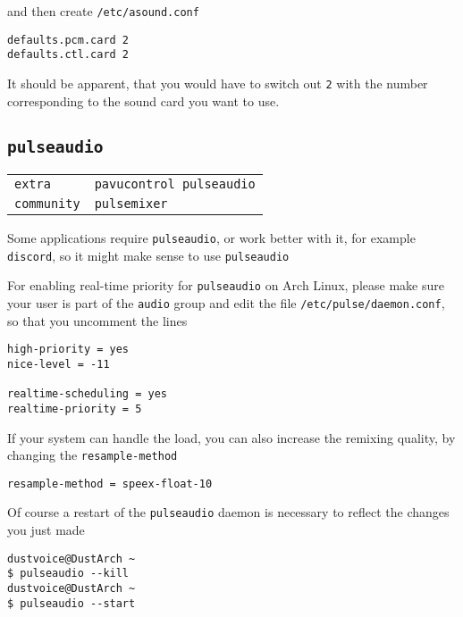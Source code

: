 \documentclass[9pt]{report}
\newenvironment{NOTE}
{\begin{tcolorbox}[colback=admonitionBG,coltitle=draculaFG,colframe=draculaBlue,colbacktitle=draculaBlue,title=NOTE]}
{\end{tcolorbox}}
\newenvironment{packagetable}
{\begin{longtabu}to \textwidth [b]{X[1,r]|X[1,l]}}
{\end{longtabu}}
\begin{document}
and then create \texttt{/etc/asound.conf}


\begin{verbatim}
defaults.pcm.card 2
defaults.ctl.card 2
\end{verbatim}

\begin{NOTE}
    It should be apparent, that you would have to switch out \texttt{2} with the number corresponding to the sound card you want to use.

\end{NOTE}

\newpage

\hypertarget{x-pulseaudio}{\subsection{\texttt{pulseaudio}}}
\begin{packagetable}
    \texttt{extra} & \texttt{pavucontrol pulseaudio} \\ 
    \texttt{community} & \texttt{pulsemixer} \\ 
\end{packagetable}

Some applications require \texttt{pulseaudio}, or work better with it, for example \texttt{discord}, so it might make sense to use \texttt{pulseaudio}


For enabling real-time priority for \texttt{pulseaudio} on Arch Linux, please make sure your user is part of the \texttt{audio} group and edit the file \texttt{/etc/pulse/daemon.conf}, so that you uncomment the lines


\begin{verbatim}
high-priority = yes
nice-level = -11

realtime-scheduling = yes
realtime-priority = 5
\end{verbatim}

If your system can handle the load, you can also increase the remixing quality, by changing the \texttt{resample-method}


\begin{verbatim}
resample-method = speex-float-10
\end{verbatim}

Of course a restart of the \texttt{pulseaudio} daemon is necessary to reflect the changes you just made


\begin{verbatim}
dustvoice@DustArch ~
$ pulseaudio --kill
dustvoice@DustArch ~
$ pulseaudio --start
\end{verbatim}
\end{document}
